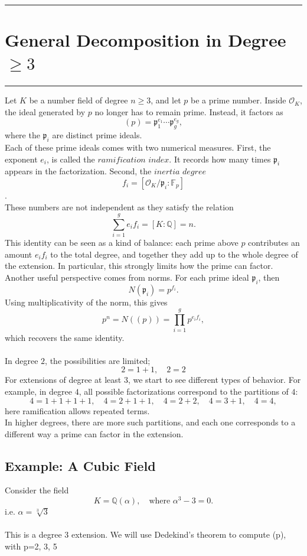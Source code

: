 \medskip 
{\color{gray}\hrule}
\section{General Decomposition in Degree $\geq 3$}
\medskip 
{\color{gray}\hrule}
\medskip
Let $K$ be a number field of degree $n \geq 3$, and let $p$ be a prime number. Inside $\mathcal{O}_K$, the ideal generated by $p$ no longer has to remain prime. Instead, it factors as
\[
(p) = \mathfrak{p}_1^{e_1} \cdots \mathfrak{p}_g^{e_g},
\]
where the $\mathfrak{p}_i$ are distinct prime ideals.\\
Each of these prime ideals comes with two numerical measures. First, the exponent $e_i$, is called the $ramification$ $index$. It records how many times $\mathfrak{p}_i$ appears in the factorization. Second, the $inertia$ $degree$
\[
f_i = [\mathcal{O}_K/\mathfrak{p}_i : \mathbb{F}_p]
\].\\
These numbers are not independent as they satisfy the relation
\[
\sum_{i=1}^g e_i f_i = [K : \mathbb{Q}] = n.
\]
This identity can be seen as a kind of balance: each prime above $p$ contributes an amount $e_i f_i$ to the total degree, and together they add up to the whole degree of the extension. In particular, this strongly limits how the prime can factor.\\
Another useful perspective comes from norms. For each prime ideal $\mathfrak{p}_i$, then
\[
N(\mathfrak{p}_i) = p^{f_i}.
\]
Using multiplicativity of the norm, this gives
\[
p^n = N((p)) = \prod_{i=1}^g p^{e_i f_i},
\]
which recovers the same identity.\\\\
In degree $2$, the possibilities are limited; 
\[
2 = 1+1,\quad 2 = 2
\]
For extensions of degree at least $3$, we start to see different types of behavior. 
For example, in degree $4$, all possible factorizations correspond to the partitions of $4$:
\[
4 = 1+1+1+1, \quad 4 = 2+1+1, \quad 4 = 2+2, \quad 4 = 3+1, \quad 4 = 4,
\]
here ramification allows repeated terms.\\
In higher degrees, there are more such partitions, and each one corresponds to a different way a prime can factor in the extension.

\subsection{Example: A Cubic Field}

Consider the field
\[
K = \mathbb{Q}(\alpha), \quad \text{where } \alpha^3 - 3 = 0.
\]
i.e. $\alpha = \sqrt[3]{3}$
\\\\This is a degree $3$ extension. We will use Dedekind's theorem to compute (p), with p=2, 3, 5

